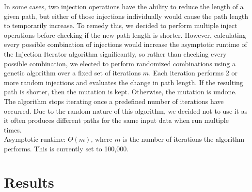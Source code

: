 \documentclass{article}
\begin{document}
In some cases, two injection operations have the ability to reduce the length
of a given path, but either of those injections individually would cause the
path length to temporarily increase. To remedy this, we decided to perform
multiple inject operations before checking if the new path length is shorter.
However, calculating every possible combination of injections would increase
the asymptotic runtime of the Injection Iterator algorithm significantly, so rather than checking every possible combination, we
elected to perform randomized combinations using a genetic algorithm over a
fixed set of iterations $m$. Each iteration performs 2 or more random
injections and evaluates the change in path length. If the resulting path is
shorter, then the mutation is kept. Otherwise, the mutation is undone. The
algorithm stops iterating once a predefined number of iterations have occurred.
Due to the random nature of this algorithm, we decided not to use it as it
often produces different paths for the same input data when run multiple
times.\\Asymptotic runtime: $\Theta (m)$, where $m$ is the number of iterations
the algorithm performs. This is currently set to 100,000.

\section*{Results}
\end{document}
